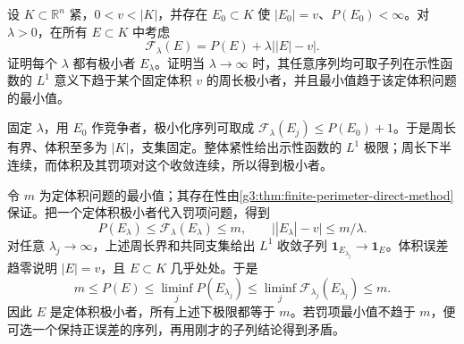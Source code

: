 \begin{exercise}\label{g3:ex:perimeter-volume-penalty}
	设 \(K\subset\mathbb R^n\) 紧，\(0<v<|K|\)，并存在 \(E_0\subset K\) 使 \(|E_0|=v\)、\(P(E_0)<\infty\)。对 \(\lambda>0\)，在所有 \(E\subset K\) 中考虑
	\[
		\mathcal F_\lambda(E)=P(E)+\lambda\bigl||E|-v\bigr|.
	\]
	证明每个 \(\lambda\) 都有极小者 \(E_\lambda\)。证明当 \(\lambda\to\infty\) 时，其任意序列均可取子列在示性函数的 \(L^1\) 意义下趋于某个固定体积 \(v\) 的周长极小者，并且最小值趋于该定体积问题的最小值。
\end{exercise}
\begin{solution}
	固定 \(\lambda\)，用 \(E_0\) 作竞争者，极小化序列可取成
	\(\mathcal F_\lambda(E_j)\le P(E_0)+1\)。于是周长有界、体积至多为 \(|K|\)，支集固定。整体紧性给出示性函数的 \(L^1\) 极限；周长下半连续，而体积及其罚项对这个收敛连续，所以得到极小者。

	令 \(m\) 为定体积问题的最小值；其存在性由\cref{g3:thm:finite-perimeter-direct-method}保证。把一个定体积极小者代入罚项问题，得到
	\[
		P(E_\lambda)\le\mathcal F_\lambda(E_\lambda)\le m,\qquad
		\bigl||E_\lambda|-v\bigr|\le m/\lambda.
	\]
	对任意 \(\lambda_j\to\infty\)，上述周长界和共同支集给出 \(L^1\) 收敛子列 \(\mathbf1_{E_{\lambda_j}}\to\mathbf1_E\)。体积误差趋零说明 \(|E|=v\)，且 \(E\subset K\) 几乎处处。于是
	\[
		m\le P(E)\le\liminf_jP(E_{\lambda_j})
		\le\liminf_j\mathcal F_{\lambda_j}(E_{\lambda_j})\le m.
	\]
	因此 \(E\) 是定体积极小者，所有上述下极限都等于 \(m\)。若罚项最小值不趋于 \(m\)，便可选一个保持正误差的序列，再用刚才的子列结论得到矛盾。
\end{solution}

